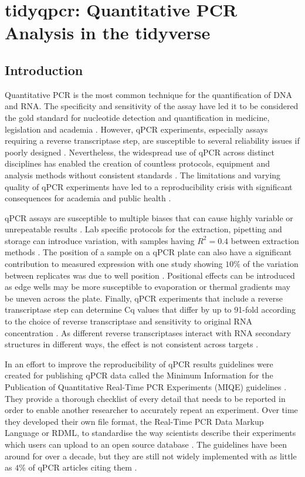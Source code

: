 \documentclass[../main.tex]{subfiles}
\begin{document}
\chapter{tidyqpcr: Quantitative PCR Analysis in the tidyverse}

\section{Introduction}

Quantitative PCR is the most common technique for the quantification of DNA and RNA. 
The specificity and sensitivity of the assay have led it to be considered the gold standard for nucleotide detection and quantification in medicine, legislation and academia \parencite{Kubista2006}.
However, qPCR experiments, especially assays requiring a reverse transcriptase step, are susceptible to several reliability issues if poorly designed \parencite{Bustin2002}.
Nevertheless, the widespread use of qPCR across distinct disciplines has enabled the creation of countless protocols, equipment and analysis methods without consistent standards \parencite{Bustin2021}.
The limitations and varying quality of qPCR experiments have led to a reproducibility crisis with significant consequences for academia \parencite{Garson2009} and public health \parencite{Bustin2013}. 

qPCR assays are susceptible to multiple biases that can cause highly variable or unrepeatable results \parencite{Bustin2002}.
Lab specific protocols for the extraction, pipetting and storage can introduce variation, with samples having $R^2 = 0.4$ between extraction methods \parencite{Bustin2017, Dagnall2017}.
The position of a sample on a qPCR plate can also have a significant contribution to measured expression with one study showing $10\%$ of the variation between replicates was due to well position \parencite{Eisenberg2015}. 
Positional effects can be introduced as edge wells may be more susceptible to evaporation or thermal gradients may be uneven across the plate. 
Finally, qPCR experiments that include a reverse transcriptase step can determine Cq values that differ by up to 91-fold according to the choice of reverse transcriptase and sensitivity to original RNA concentration \parencite{Stahlberg2004}.
As different reverse transcriptases interact with RNA secondary structures in different ways, the effect is not consistent across targets \parencite{Brooks1995, Williams1992}.

In an effort to improve the reproducibility of qPCR results guidelines were created for publishing qPCR data called the Minimum Information for the Publication of Quantitative Real-Time PCR Experiments (MIQE) guidelines \parencite{Bustin2009}.
They provide a thorough checklist of every detail that needs to be reported in order to enable another researcher to accurately repeat an experiment. 
Over time they developed their own file format, the Real-Time PCR Data Markup Language or RDML, to standardise the way scientists describe their experiments which users can upload to an open source database \parencite{Lefever2009, Ruijter2015}.
The guidelines have been around for over a decade, but they are still not widely implemented with as little as $4\%$ of qPCR articles citing them \parencite{AbdelNour2020}.
\end{document}
